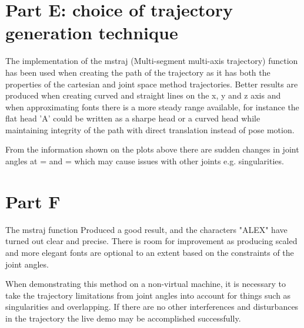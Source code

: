\documentclass[a4paper, 10pt]{article}
\begin{document}


\section{Part E: choice of trajectory generation technique}

The implementation of the mstraj (Multi-segment multi-axis trajectory) function has been used when creating the path of the trajectory as it has both the properties of the cartesian and joint space method trajectories. Better results are produced when creating curved and straight lines on the x, y and z axis and when approximating fonts there is a more steady range available, for instance the flat head 'A' could be written as a sharpe head or a curved head while maintaining integrity of the path with direct translation instead of pose motion. 

From the information shown on the plots above there are sudden changes in joint angles at = and = which may cause issues with other joints e.g. singularities.



\section{Part F}

The mstraj function Produced a good result, and the characters "ALEX" have turned out clear and precise. There is room for improvement as producing scaled and more elegant fonts are optional to an extent based on the constraints of the joint angles. 

When demonstrating this method on a non-virtual machine, it is necessary to take the trajectory limitations from joint angles into account for things such as singularities and overlapping. If there are no other interferences and disturbances in the trajectory the live demo may be accomplished successfully.
\end{document}
